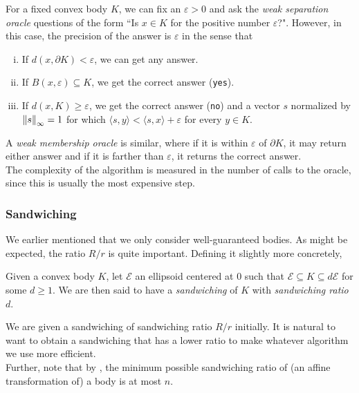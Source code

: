 \begin{definition}
For a fixed convex body $K$, we can fix an $\varepsilon>0$ and ask the \textit{weak separation oracle} questions of the form ``Is $x\in K$ for the positive number $\varepsilon$?". However, in this case, the precision of the answer is $\varepsilon$ in the sense that
\begin{enumerate}[(i)]
    \item If $d(x,\partial K)<\varepsilon$, we can get any answer.
    \item If $B(x,\varepsilon)\subseteq K$, we get the correct answer (\texttt{yes}).
    \item If $d(x,K)\geq\varepsilon$, we get the correct answer (\texttt{no}) and a vector $s$ normalized by $\left\lVert s\right\rVert_\infty=1$ for which $\langle s,y\rangle < \langle s,x\rangle+\varepsilon$ for every $y\in K$.
\end{enumerate}
\end{definition}

A \textit{weak membership oracle} is similar, where if it is within $\varepsilon$ of $\partial K$, it may return either answer and if it is farther than $\varepsilon$, it returns the correct answer.\\

The complexity of the algorithm is measured in the number of calls to the oracle, since this is usually the most expensive step.

\subsubsection{Sandwiching}

We earlier mentioned that we only consider well-guaranteed bodies. As might be expected, the ratio $R/r$ is quite important. Defining it slightly more concretely,

\begin{definition}
Given a convex body $K$, let $\mathcal{E}$ an ellipsoid centered at $0$ such that $\mathcal{E}\subseteq K\subseteq d\mathcal{E}$ for some $d\geq 1$. We are then said to have a \textit{sandwiching} of $K$ with \textit{sandwiching ratio} $d$.
\end{definition}

We are given a sandwiching of sandwiching ratio $R/r$ initially. It is natural to want to obtain a sandwiching that has a lower ratio to make whatever algorithm we use more efficient.\\
Further, note that by , the minimum possible sandwiching ratio of (an affine transformation of) a body is at most $n$.\\

